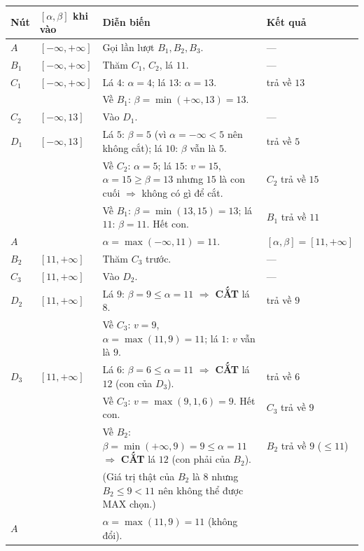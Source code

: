 \documentclass[a4paper,11pt]{article}
\begin{document}
\footnotesize
\begin{longtable}{@{}p{1.0cm} >{\raggedright\arraybackslash}p{2.5cm} >{\raggedright\arraybackslash}p{8.3cm} >{\raggedright\arraybackslash}p{3.3cm}@{}}
\toprule
\textbf{Nút} & $[\alpha,\beta]$ \textbf{khi vào} & \textbf{Diễn biến} & \textbf{Kết quả} \\
\midrule
\endhead
$A$ & $[-\infty,+\infty]$ & Gọi lần lượt $B_1,B_2,B_3$. & --- \\
$B_1$ & $[-\infty,+\infty]$ & Thăm $C_1$, $C_2$, lá $11$. & --- \\
$C_1$ & $[-\infty,+\infty]$ & Lá $4$: $\alpha=4$; lá $13$: $\alpha=13$. & trả về $13$ \\
 & & Về $B_1$: $\beta=\min(+\infty,13)=13$. & \\
$C_2$ & $[-\infty,13]$ & Vào $D_1$. & --- \\
$D_1$ & $[-\infty,13]$ & Lá $5$: $\beta=5$ (vì $\alpha=-\infty<5$ nên không cắt); lá $10$: $\beta$ vẫn là $5$. & trả về $5$ \\
 & & Về $C_2$: $\alpha=5$; lá $15$: $v=15$, $\alpha=15\ge\beta=13$ nhưng $15$ là con cuối $\Rightarrow$ không có gì để cắt. & $C_2$ trả về $15$ \\
 & & Về $B_1$: $\beta=\min(13,15)=13$; lá $11$: $\beta=11$. Hết con. & $B_1$ trả về $11$ \\
$A$ & & $\alpha=\max(-\infty,11)=11$. & $[\alpha,\beta]=[11,+\infty]$ \\
\midrule
$B_2$ & $[11,+\infty]$ & Thăm $C_3$ trước. & --- \\
$C_3$ & $[11,+\infty]$ & Vào $D_2$. & --- \\
$D_2$ & $[11,+\infty]$ & Lá $9$: $\beta=9\le\alpha=11$ $\Rightarrow$ \textbf{CẮT} lá $8$. & trả về $9$ \\
 & & Về $C_3$: $v=9$, $\alpha=\max(11,9)=11$; lá $1$: $v$ vẫn là $9$. & \\
$D_3$ & $[11,+\infty]$ & Lá $6$: $\beta=6\le\alpha=11$ $\Rightarrow$ \textbf{CẮT} lá $12$ (con của $D_3$). & trả về $6$ \\
 & & Về $C_3$: $v=\max(9,1,6)=9$. Hết con. & $C_3$ trả về $9$ \\
 & & Về $B_2$: $\beta=\min(+\infty,9)=9\le\alpha=11$ $\Rightarrow$ \textbf{CẮT} lá $12$ (con phải của $B_2$). & $B_2$ trả về $9$ ($\le 11$) \\
 & & (Giá trị thật của $B_2$ là $8$ nhưng $B_2\le 9<11$ nên không thể được MAX chọn.) & \\
$A$ & & $\alpha=\max(11,9)=11$ (không đổi). & \\
\midrule

\end{longtable}
\end{document}
